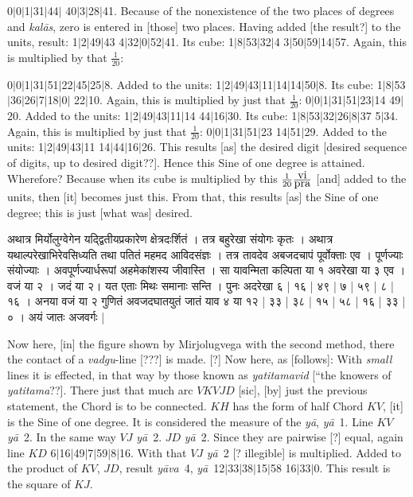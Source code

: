 \documentclass[11pt,a5paper]{book}
\def\kalas{\textit{ka\-l\=as}}
\def\ya{\textit{y\=a}}
\def\yava{\textit{y\=ava}}
\def\danda{$|$}
\begin{document}
0\danda 0\danda 1\danda 31\danda 44\danda
40\danda 3\danda 28\danda 41.
Because of the nonexistence of the two places of degrees and \kalas, zero is entered in 
[those] two places. Having added [the result?] to the units, result:
1\danda 2\danda 49\danda 43 4\danda 32\danda 0\danda 52\danda 41. Its cube:
1\danda 8\danda 53\danda 32\danda 4 3\danda 50\danda 59\danda 14\danda 57.
Again, this  is multiplied by that $\frac{1}{20}$: 


0\danda 0\danda 1\danda 31\danda 51\danda 22\danda 45\danda 25\danda 8.
Added to the units:
1\danda 2\danda 49\danda 43\danda 11\danda 14\danda 14\danda 50\danda 8.
Its cube: 1\danda 8\danda 53\danda 36\danda 26\danda 7\danda 18\danda 0\danda
22\danda 10.
Again, this is multiplied by just that $\frac{1}{20}$: 
0\danda 0\danda 1\danda 31\danda 51\danda 23\danda 14 49\danda 20.
Added to the units: 1\danda 2\danda 49\danda 43\danda 11\danda 14 44\danda 16\danda 30.
Its cube: 1\danda 8\danda 53\danda 32\danda 26\danda 8\danda 37 5\danda 34.
Again, this is multiplied by just that $\frac{1}{20}$: 
0\danda 0\danda 1\danda 31\danda 51\danda 23 14\danda 51\danda 29. 
Added to the units: 1\danda 2\danda 49\danda 43\danda 11 14\danda 44\danda 16\danda 26.
This results [as] the desired digit [desired sequence of digits, up to desired digit??]. 
Hence this Sine of one degree is attained.  Wherefore?  Because when its cube 
is multiplied by this $\frac{1}{20} \frac{\hbox{vi}}{\hbox{pra}}$ [and] added to the units,
then [it] becomes just this. From that, this results [as] the Sine of one degree; this is just
[what was] desired. 



\newpage
{\s अथात्र मिर्योलुग्वेगेन
यद्द्वितीयप्रकारेण क्षेत्रदःर्शितं । तत्र बहुरेखा संयोगः कृतः । 
अथात्र यथाल्परेखाभिरेवसिध्यति तथा पतितं महमद आविदसंज्ञः । 
तत्र तावदेव अबजदचापं पूर्वोक्ताः एव । पूर्णज्याः
संयोज्याः । अवपूर्णज्यार्धरूपां अहमेकांशस्य जीवास्ति । 
सा यावन्मिता कल्पिता या १ अवरेखा या ३ एव । वजं  या २ । जदं या २। यत एताः मिथः
समानाः सन्ति । पुनः अदरेखा ६ | १६ | ४९ | ७ | ५९ | ८ | १६ । अनया वजं या २
गुणितं अवजदघातयुतं जातं याव ४ या १२ | ३३ | ३८ | १५ | ५८ | १६ | ३३ | ० । अयं
जातः अजवर्गः |}
\newpage

Now here, [in] the figure shown by Mirjolugvega with the second method, there 
the contact of a \textit{vadgu}-line [???] is made. [?]  Now here, as [follows]:  
With \emph{small} lines 
it is effected, in that way by those known as \textit{yatitamavid} [``the knowers of
\textit{yatitama}??].  There just that much arc $VKVJD$ [sic], [by] just the previous
statement, the Chord is to be connected. $KH$ has the form of half Chord $KV$, 
[it] is the Sine of one degree. It is considered the measure of the \ya, \ya\ 1.
Line $KV$ \ya\ 2. In the same way $VJ$ \ya\ 2. $JD$ \ya\ 2. Since they are 
pairwise [?] equal, again line $KD$
6\danda 16\danda 49\danda 7\danda 59\danda 8\danda 16. 
With that $VJ$ \ya\ 2 [? illegible] is multiplied. Added to the product of
$KV$, $JD$, result \yava\ 4, \ya\ 12\danda 33\danda 38\danda 15\danda 58
16\danda 33\danda 0. This result is the square of $KJ$. \\
\end{document}
